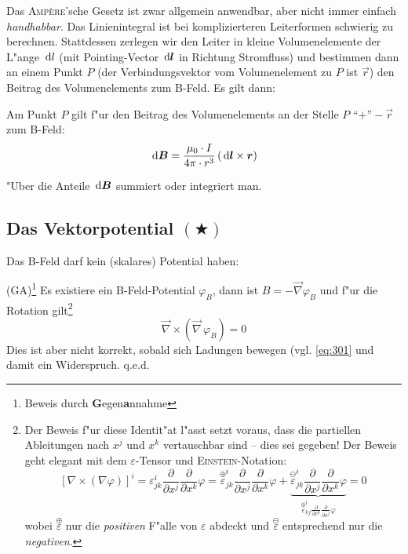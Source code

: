 Das \textsc{Amp\`ere}'sche Gesetz ist zwar allgemein anwendbar, aber
nicht immer einfach \emph{handhabbar}. Das Linienintegral ist bei
komplizierteren Leiterformen schwierig zu berechnen. Stattdessen
zerlegen wir den Leiter in kleine Volumenelemente der L"ange $\, \mathrm{d} l$ (mit
Pointing-Vector $\, \mathrm{d} \boldsymbol{l}$ in Richtung Stromfluss)
und bestimmen dann an einem Punkt $P$ (der Verbindungsvektor vom
Volumenelement zu $P$ ist $\vec r$) den Beitrag des Volumenelements
zum B-Feld.  Es gilt dann:
\begin{Wichtig}
     Am Punkt $P$ gilt f"ur den Beitrag des Volumenelements an
   der Stelle $P \text{~``+''} -\vec r$ zum B-Feld:
   \begin{equation}
      \label{eqn_biot-savart}
      \, \mathrm{d} \boldsymbol{B} = \frac{\mu_0 \cdot I}{4 \pi \cdot r^3} \left (
         \, \mathrm{d} \boldsymbol{l} \times \boldsymbol{r} \right )
   \end{equation}
\end{Wichtig}
"Uber die Anteile $\, \mathrm{d} \boldsymbol{B}$ summiert oder integriert man.




\subsection{Das Vektorpotential $(\bigstar)$}
\label{kap_vektorpotential}

\begin{Wichtig}
Das B-Feld darf kein (skalares) Potential haben:
\end{Wichtig}
  (GA)\footnote{Beweis durch \textbf{G}egen\textbf{a}nnahme} Es existiere ein
B-Feld-Potential $\varphi_B$, dann ist $B = - \vec \nabla \varphi_B$
und f"ur die Rotation gilt\footnote{Der Beweis f"ur diese Identit"at
  l"asst setzt voraus, dass die partiellen Ableitungen nach $x^j$ und
  $x^k$ vertauschbar sind -- dies sei gegeben! Der Beweis geht elegant
mit dem $\varepsilon$-Tensor und \textsc{Einstein}-Notation:
$$
\left [ \nabla \times (\nabla \varphi)
\right ]^i
=
 \varepsilon^i_{jk} \frac{\partial }{\partial
  x^j}\frac{\partial }{\partial x^k}\varphi
=
\stackrel{\oplus}{\varepsilon}^i_{jk} \frac{\partial }{\partial
  x^j}\frac{\partial }{\partial x^k}\varphi + \underbrace{\stackrel{\ominus}{\varepsilon}^i_{jk} \frac{\partial }{\partial
  x^j}\frac{\partial }{\partial x^k}\varphi }_{
\stackrel{\oplus}{\varepsilon}^i_{kj} \frac{\partial }{\partial
  x^k}\frac{\partial }{\partial x^j}\varphi
}
=
0
$$
wobei $\stackrel{\oplus}{\varepsilon}$ nur die \emph{positiven}
F"alle von $\varepsilon$ abdeckt und $\stackrel{\ominus}{\varepsilon}$
entsprechend nur die \emph{negativen}.}
\begin{equation*}
   \vec \nabla \times \left ( \vec \nabla \, \varphi_B \right ) = 0
\end{equation*}
Dies ist aber nicht korrekt, sobald sich Ladungen bewegen
(vgl. \eqref{eq:301} und damit ein Widerspruch. q.e.d.

